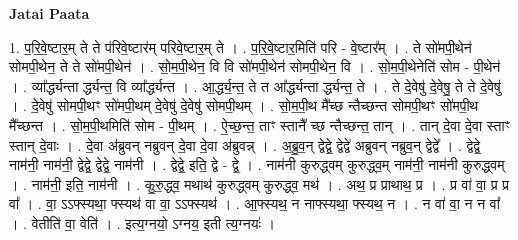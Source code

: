 \documentclass[17pt]{extarticle}
\begin{document}
\textbf{Jatai Paata} \newline

1. प॒रि॒वे॒ष्टार॒म् ते ते प॑रिवे॒ष्टार॑म् परिवे॒ष्टार॒म् ते । . प॒रि॒वे॒ष्टार॒मिति॑ परि - वे॒ष्टार᳚म् । . ते सो॑मपी॒थेन॑ सोमपी॒थेन॒ ते ते सो॑मपी॒थेन॑ । . सो॒म॒पी॒थेन॒ वि वि सो॑मपी॒थेन॑ सोमपी॒थेन॒ वि । . सो॒म॒पी॒थेनेति॑ सोम - पी॒थेन॑ । . व्या᳚र्द्ध्यन्ता र्द्ध्यन्त॒ वि व्या᳚र्द्ध्यन्त । . आ॒र्द्ध्य॒न्त॒ ते त आ᳚र्द्ध्यन्ता र्द्ध्यन्त॒ ते । . ते दे॒वेषु॑ दे॒वेषु॒ ते ते दे॒वेषु॑ । . दे॒वेषु॑ सोमपी॒थꣳ सो॑मपी॒थम् दे॒वेषु॑ दे॒वेषु॑ सोमपी॒थम् । . सो॒म॒पी॒थ मै᳚च्छ न्तैच्छन्त सोमपी॒थꣳ सो॑मपी॒थ मै᳚च्छन्त । . सो॒म॒पी॒थमिति॑ सोम - पी॒थम् । . ऐ॒च्छ॒न्त॒ ताꣳ स्तानै᳚ च्छ न्तैच्छन्त॒ तान् । . तान् दे॒वा दे॒वा स्ताꣳ स्तान् दे॒वाः । . दे॒वा अ॑ब्रुवन् नब्रुवन् दे॒वा दे॒वा अ॑ब्रुवन्न् । . अ॒ब्रु॒व॒न् द्वेद्वे॒ द्वेद्वे॑ अब्रुवन् नब्रुव॒न् द्वेद्वे᳚ । . द्वेद्वे॒ नाम॑नी॒ नाम॑नी॒ द्वेद्वे॒ द्वेद्वे॒ नाम॑नी । . द्वे‌द्वे॒ इति॒ द्वे - द्वे॒ । . नाम॑नी कुरुद्ध्वम् कुरुद्ध्व॒म् नाम॑नी॒ नाम॑नी कुरुद्ध्वम् । . नाम॑नी॒ इति॒ नाम॑नी । . कु॒रु॒द्ध्व॒ मथाथ॑ कुरुद्ध्वम् कुरुद्ध्व॒ मथ॑ । . अथ॒ प्र प्राथाथ॒ प्र । . प्र वा॑ वा॒ प्र प्र वा᳚ । . वा॒ ऽऽफ्स्यथा॒ फ्स्यथ॑ वा वा॒ ऽऽफ्स्यथ॑ । . आ॒फ्स्यथ॒ न नाफ्स्यथा॒ फ्स्यथ॒ न । . न वा॑ वा॒ न न वा᳚ । . वेतीति॑ वा॒ वेति॑ । . इत्य॒ग्नयो॒ ऽग्नय॒ इती त्य॒ग्नयः॑ । \newline
\end{document}
